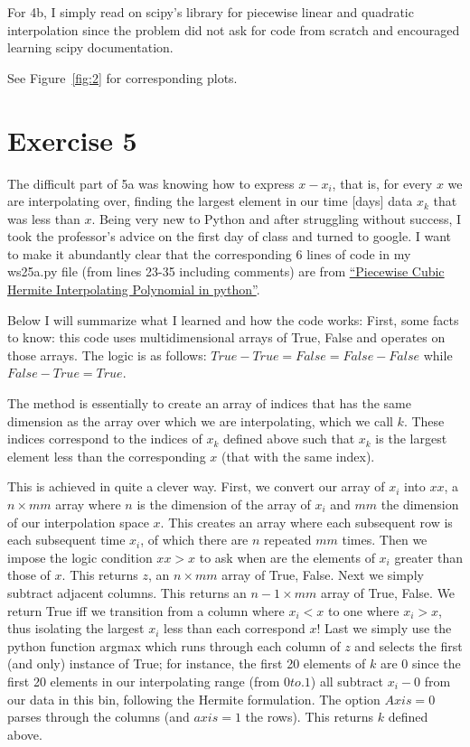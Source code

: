 \documentclass[11pt,letterpaper]{article}
\begin{document}
For 4b, I simply read on scipy's library for piecewise linear and quadratic interpolation since the problem did not ask for code from scratch and encouraged learning scipy documentation.

See Figure~\ref{fig:2} for corresponding plots.
\section{Exercise 5}
The  difficult part of 5a was knowing how to express $x - x_i$, that is, for every $x$ we are interpolating over, finding the largest  element in our time [days] data $x_k$ 
that was less than $x$. Being very new to Python and after struggling without success, I took the professor's advice on the first day of class and turned to google. I want to make it abundantly clear that the corresponding 6 lines of code in my ws25a.py file (from lines 23-35 including comments) are from \href{http://matplotlib.1069221.n5.nabble.com/quot-Piecewise-Cubic-Hermite-Interpolating-Polynomial-quot-in-python-td24157.html}{``Piecewise Cubic Hermite Interpolating Polynomial in python''}.

Below I will summarize what I learned and how the code works:
First, some facts to know: this code uses multidimensional arrays of True, False and operates on those arrays. The logic is as follows:  $True - True = False = False - False$ while $False -True =True$.

The method is essentially to create an array of indices that has the same dimension as the array over which we are interpolating, which we call $k$. These indices correspond to the indices of $x_k$ defined above such that $x_k$ is the largest element less than the corresponding $x$ (that with the same index). 

This is achieved in quite a clever way. First, we convert our array of $x_i$ into $xx$, a $n \times mm$ array where $n$ is the dimension of the array of $x_i$ and $mm$ the dimension of our interpolation space $x$. This creates an array where each subsequent row is each subsequent time $x_i$, of which there are $n$ repeated $mm$ times. 
Then we impose the logic condition $xx>x$ to ask when are the elements of $x_i$ greater than those of $x$. This returns $z$, an $n \times mm$ array of True, False. 
Next we simply subtract adjacent columns. This returns an $n-1 \times mm$ array of True, False. We return True iff we transition from a column where $x_i < x$ to one where $x_i>x$, thus isolating the largest $x_i$ less than each correspond $x$! 
Last we simply use the python function argmax which runs through each column of $z$ and selects the first (and only) instance of True; for instance, the first 20 elements of $k$ are $0$ since the first 20 elements in our interpolating range (from $0 to .1$) all subtract $x_i-0$ from our data in this bin, following the Hermite formulation. The option $Axis=0$ parses through the columns (and $axis=1$ the rows). This returns $k$ defined above.
\end{document}
